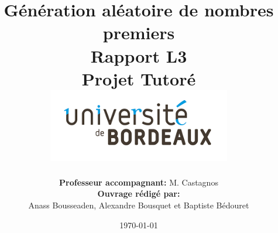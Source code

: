 \documentclass[12pt,openright,twoside,openany]{report}
\title{
	{\LARGE \textbf{ Génération aléatoire de nombres premiers} }\\ %
    {\large Rapport L3 }\\
    {\large Projet Tutoré}\\
    {\vspace{10mm}}
    {\includegraphics[width=0.6\textwidth]{télécharger.png}}
    }
\author{\textbf{Professeur accompagnant:} M. Castagnos\\\textbf{Ouvrage rédigé par:} \\Anass Bousseaden, Alexandre Bousquet et Baptiste Bédouret} %
\date{\today}
\begin{document}
\maketitle

\clearpage
\tableofcontents

\clearpage














\printbibliography
\cite{HAC}
\cite{frwiki:Primalité}
\cite{frwiki:Sophie_Germain}
\cite{Preuve_Miller-Rabin}

\newpage
\thispagestyle{empty}
\mbox{}
\newpage
\end{document}
